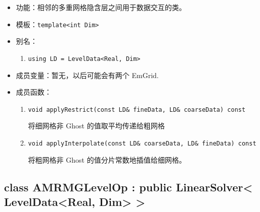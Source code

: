 \documentclass[cn, bibend=bibtex]{elegantpaper}
\theoremstyle{plain}
\begin{document}
\begin{itemize}
  \item 功能：相邻的多重网格隐含层之间用于数据交互的类。
  \item 模板：\lstinline|template<int Dim>|
  \item 别名：
  \begin{enumerate}
      \item \lstinline|using LD = LevelData<Real, Dim>|
  \end{enumerate}
  \item 成员变量：暂无，以后可能会有两个 EmGrid.
  \item 成员函数：
  \begin{enumerate}
    \item \lstinline|void applyRestrict(const LD& fineData, LD& coarseData) const|

    将细网格非 Ghost 的值取平均传递给粗网格

    \item \lstinline|void applyInterpolate(const LD& coarseData, LD& fineData) const|

    将粗网格非 Ghost 的值分片常数地插值给细网格。


    \end{enumerate}

\end{itemize}

\subsection{class AMRMGLevelOp : public LinearSolver< LevelData<Real, Dim> >}
\end{document}
